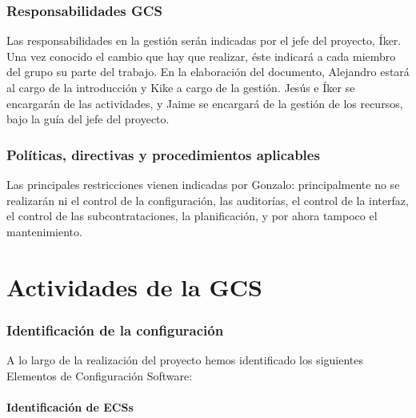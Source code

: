 \documentclass[spanish,a4paper,11pt, twoside]{report}	%
\begin{document}
	\section{Responsabilidades GCS}
	Las responsabilidades en la gestión serán indicadas por el jefe del proyecto, Íker. Una vez conocido el cambio que hay que realizar, éste indicará a cada miembro del grupo su parte del trabajo. En la elaboración del documento,
	Alejandro estará al cargo de la introducción y  Kike a cargo de la gestión. Jesús e Íker se encargarán de las actividades,  y Jaime se encargará de la gestión de los recursos, bajo la guía del jefe del proyecto.
	\section{Políticas, directivas y procedimientos aplicables}
	Las principales restricciones vienen indicadas por Gonzalo: principalmente no se realizarán ni el control de la configuración, las auditorías, el control de la interfaz, el control de las subcontrataciones, la planificación, y por ahora 
	tampoco el mantenimiento.

\newpage
\mbox{}
\thispagestyle{empty}						%
\newpage

\setcounter{section}{0}

\part{Actividades de la GCS}
	\section{Identificación de la configuración}
		A lo largo de la realización del proyecto hemos identificado los siguientes Elementos de Configuración Software:
		\subsection{Identificación de ECSs}
			
\end{document}
